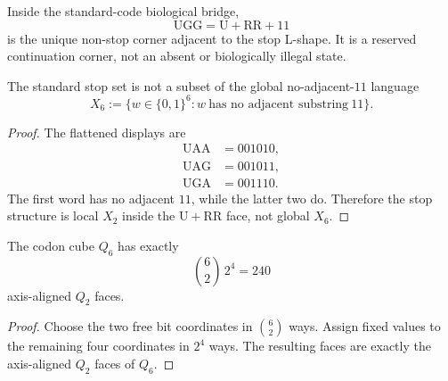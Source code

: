 \begin{corollary}
\label{cor:philosophy-spectral-inverse-ugg-continuation-corner}
Inside the standard-code biological bridge,
$$
  \mathrm{UGG}=\mathrm{U}+\mathrm{RR}+11
$$
is the unique non-stop corner adjacent to the stop L-shape. It is a
reserved continuation corner, not an absent or biologically illegal
state.
\end{corollary}

\begin{theorem}
\label{thm:philosophy-spectral-inverse-local-not-global}
The standard stop set is not a subset of the global no-adjacent-$11$
language
$$
  X_{6}:=\{w\in\{0,1\}^{6}:w\ \text{has no adjacent substring}\ 11\}.
$$
\end{theorem}
\begin{proof}
The flattened displays are
$$
\begin{aligned}
  \mathrm{UAA}&=001010,\\
  \mathrm{UAG}&=001011,\\
  \mathrm{UGA}&=001110.
\end{aligned}
$$
The first word has no adjacent $11$, while the latter two do. Therefore
the stop structure is local $X_{2}$ inside the $\mathrm{U}+\mathrm{RR}$
face, not global $X_{6}$.
\end{proof}

\begin{theorem}
\label{thm:philosophy-spectral-inverse-finite-local-face-domain}
The codon cube $Q_{6}$ has exactly
$$
  \binom{6}{2}\,2^{4}=240
$$
axis-aligned $Q_{2}$ faces.
\end{theorem}
\begin{proof}
Choose the two free bit coordinates in $\binom{6}{2}$ ways. Assign fixed
values to the remaining four coordinates in $2^{4}$ ways. The resulting
faces are exactly the axis-aligned $Q_{2}$ faces of $Q_{6}$.
\end{proof}

